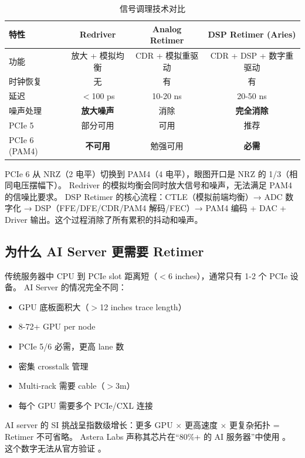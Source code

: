 \begin{table}[htb]
    \centering
    \caption{信号调理技术对比}
    \label{tab:redriver-retimer}
    \begin{tabular}{lccc}
        \toprule
        \textbf{特性} & \textbf{Redriver} & \textbf{Analog Retimer} & \textbf{DSP Retimer (Aries)} \\
        \midrule
        功能 & 放大 + 模拟均衡 & CDR + 模拟重驱动 & CDR + DSP + 数字重驱动 \\
        时钟恢复 & 无 & 有 & 有 \\
        延迟 & $<$100 ps & 10-20 ns & 20-50 ns \\
        噪声处理 & \textbf{放大噪声} & 消除 & \textbf{完全消除} \\
        PCIe 5 & 部分可用 & 可用 & 推荐 \\
        PCIe 6 (PAM4) & \textbf{不可用} & 勉强可用 & \textbf{必需} \\
        \bottomrule
    \end{tabular}
\end{table}

PCIe 6 从 NRZ（2 电平）切换到 PAM4（4 电平），眼图开口是 NRZ 的 1/3（相同电压摆幅下）。
Redriver 的模拟均衡会同时放大信号和噪声，无法满足 PAM4 的信噪比要求。
DSP Retimer 的核心流程：CTLE（模拟前端均衡）→ ADC 数字化 → DSP（FFE/DFE/CDR/PAM4 解码/FEC）→ PAM4 编码 + DAC + Driver 输出。这个过程消除了所有累积的抖动和噪声。

\subsection{为什么 AI Server 更需要 Retimer}

传统服务器中 CPU 到 PCIe slot 距离短（$<$6 inches），通常只有 1-2 个 PCIe 设备。
AI Server 的情况完全不同：

\begin{itemize}
    \item GPU 底板面积大（$>$12 inches trace length）
    \item 8-72+ GPU per node
    \item PCIe 5/6 必需，更高 lane 数
    \item 密集 crosstalk 管理
    \item Multi-rack 需要 cable（$>$3m）
    \item 每个 GPU 需要多个 PCIe/CXL 连接
\end{itemize}

AI server 的 SI 挑战呈指数级增长：更多 GPU $\times$ 更高速度 $\times$ 更复杂拓扑 = Retimer 不可省略。
Astera Labs 声称其芯片在``80\%+ 的 AI 服务器''中使用 。
这个数字无法从官方验证 \unverified{}。

